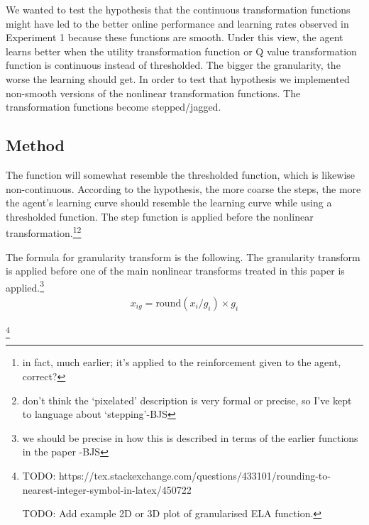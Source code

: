 

We wanted to test the hypothesis that the continuous transformation functions might have led to the better online performance and learning rates observed in Experiment 1 because these functions are smooth. Under this view, the agent learns better when the utility transformation function or Q value transformation function is continuous instead of thresholded. The bigger the granularity, the worse the learning should get. In order to test that hypothesis we implemented non-smooth versions of the nonlinear transformation functions. The transformation functions become stepped/jagged.

\subsection{Method}


The function will somewhat resemble the thresholded function, which is likewise non-continuous. According to the hypothesis, the more coarse the steps, the more the agent's learning curve should resemble the learning curve while using a thresholded function. The step function is applied before the nonlinear transformation.\footnote{in fact, much earlier; it's applied to the reinforcement given to the agent, correct?}\footnote{don't think the `pixelated' description is very formal or precise, so I've kept to language about `stepping'-BJS}

The formula for granularity transform is the following. The granularity transform is applied before one of the main nonlinear transforms treated in this paper is applied.\footnote{we should be precise in how this is described in terms of the earlier functions in the paper -BJS}
\begin{align}
x_{ig} = \text{round}(x_i / g_i) \times g_i
\end{align}

\footnote{TODO: https://tex.stackexchange.com/questions/433101/rounding-to-nearest-integer-symbol-in-latex/450722

TODO: Add example 2D or 3D plot of granularised ELA function.}



